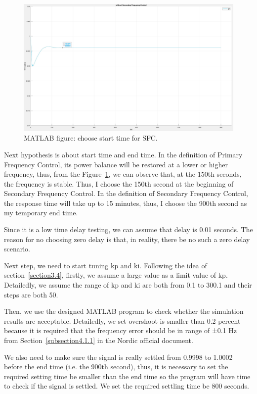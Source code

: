 \begin{figure}[htbp]
\centering
\includegraphics[width = .891\textwidth]{figure/4_1_1_without3.jpeg}
\caption{MATLAB figure: choose start time for SFC.}
\label{4_1_1_without3}
\end{figure}
Next hypothesis is about start time and end time. In the definition of Primary Frequency Control, its power balance will be restored at a lower or higher frequency, thus, from the Figure~\ref{4_1_1_without3}, we can observe that, at the 150th seconds, the frequency is stable. Thus, I choose the 150th second at the beginning of Secondary Frequency Control. In the definition of Secondary Frequency Control, the response time will take up to 15 minutes, thus, I choose the 900th second as my temporary end time. 

Since it is a low time delay testing, we can assume that delay is 0.01 seconds. The reason for no choosing zero delay is that, in reality, there be no such a zero delay scenario. 

Next step, we need to start tuning kp and ki. Following the idea of section~\ref{section3.4}, firstly, we assume a large value as a limit value of kp. Detailedly, we assume the range of kp and ki are both from 0.1 to 300.1 and their steps are both 50.  

Then, we use the designed MATLAB program to check whether the simulation results are acceptable. Detailedly, we set overshoot is smaller than 0.2 percent because it is required that the frequency error should be in range of ±0.1 Hz from Section~\ref{subsection4.1.1} in the Nordic official document. 

We also need to make sure the signal is really settled from 0.9998 to 1.0002 before the end time (i.e. the 900th second), thus, it is necessary to set the required setting time be smaller than the end time so the program will have time to check if the signal is settled. We set the required settling time be 800 seconds.  

